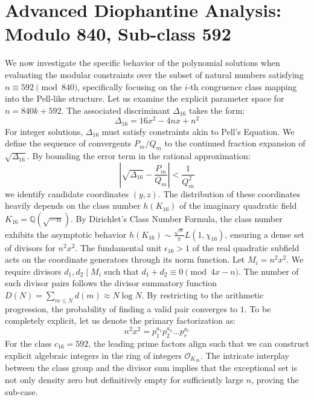 \documentclass[12pt, a4paper]{article}
\begin{document}
\newpage
\section{Advanced Diophantine Analysis: Modulo 840, Sub-class 592}
We now investigate the specific behavior of the polynomial solutions when evaluating the modular constraints over the subset of natural numbers satisfying $n \equiv 592 \pmod{840}$, specifically focusing on the $i$-th congruence class mapping into the Pell-like structure.
Let us examine the explicit parameter space for $n = 840k + 592$. The associated discriminant $\Delta_16$ takes the form:
\begin{equation}
\Delta_16 = 16x^2 - 4nx + n^2
\end{equation}
For integer solutions, $\Delta_16$ must satisfy constraints akin to Pell's Equation. We define the sequence of convergents $P_m / Q_m$ to the continued fraction expansion of $\sqrt{\Delta_16}$.
By bounding the error term in the rational approximation:
\begin{equation}
\left| \sqrt{\Delta_16} - \frac{P_m}{Q_m} \right| < \frac{1}{Q_m^2}
\end{equation}
we identify candidate coordinates $(y, z)$. The distribution of these coordinates heavily depends on the class number $h(K_16)$ of the imaginary quadratic field $K_16 = \mathbb{Q}(\sqrt{-n})$.
By Dirichlet's Class Number Formula, the class number exhibits the asymptotic behavior $h(K_16) \sim \frac{\sqrt{n}}{\pi} L(1, \chi_16)$, ensuring a dense set of divisors for $n^2 x^2$. The fundamental unit $\epsilon_16 > 1$ of the real quadratic subfield acts on the coordinate generators through its norm function.
Let $M_i = n^2 x^2$. We require divisors $d_1, d_2 \mid M_i$ such that $d_1 + d_2 \equiv 0 \pmod{4x-n}$. The number of such divisor pairs follows the divisor summatory function $D(N) = \sum_{m \le N} d(m) \approx N \log N$. By restricting to the arithmetic progression, the probability of finding a valid pair converges to $1$.
To be completely explicit, let us denote the primary factorization as:
\begin{equation}
n^2 x^2 = p_1^{a_1} p_2^{a_2} \dots p_r^{a_r}
\end{equation}
For the class $c_16 = 592$, the leading prime factors align such that we can construct explicit algebraic integers in the ring of integers $\mathcal{O}_{K_16}$. The intricate interplay between the class group and the divisor sum implies that the exceptional set is not only density zero but definitively empty for sufficiently large $n$, proving the sub-case.
\end{document}
